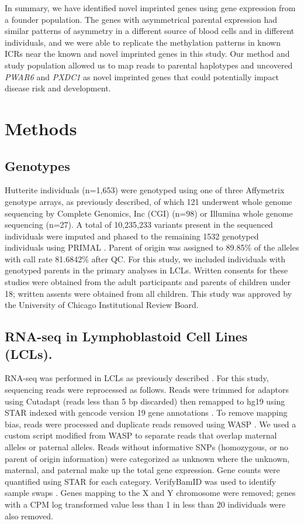 In summary, we have identified novel imprinted genes using gene expression from a founder population. The genes with asymmetrical parental expression had similar patterns of asymmetry in a different source of blood cells and in different individuals, and we were able to replicate the methylation patterns in known ICRs near the known and novel imprinted genes in this study. Our method and study population allowed us to map reads to parental haplotypes and uncovered \emph{PWAR6} and \emph{PXDC1} as novel imprinted genes that could potentially impact disease risk and development.

\section{Methods}\label{ch03-methods}

\subsection{Genotypes}\label{Genotypes}
Hutterite individuals (n=1,653) were genotyped using one of three Affymetrix genotype arrays, as previously described\citep{Livne2015}, of which 121 underwent whole genome sequencing by Complete Genomics, Inc (CGI) (n=98) or Illumina whole genome sequencing (n=27). A total of 10,235,233 variants present in the sequenced individuals were imputed and phased to the remaining 1532 genotyped individuals using PRIMAL \citep{Livne2015}. Parent of origin was assigned to 89.85\% of the alleles with call rate 81.6842\% after QC. For this study, we included individuals with genotyped parents in the primary analyses in LCLs. Written consents for these studies were obtained from the adult participants and parents of children under 18; written assents were obtained from all children. This study was approved by the University of Chicago Institutional Review Board.   

\subsection{RNA-seq in Lymphoblastoid Cell Lines (LCLs).}\label{RNA-seq in Lymphoblastoid Cell Lines (LCLs).}
RNA-seq was performed in LCLs as previously described \citep{Cusanovich:2016id}. For this study, sequencing reads were reprocessed as follows. Reads were trimmed for adaptors using Cutadapt (reads less than 5 bp discarded) then remapped to hg19 using STAR indexed with gencode version 19 gene annotations \citep{Dobin:2002by, Martin:2011eu}. To remove mapping bias, reads were processed and duplicate reads removed using WASP \citep{vandeGeijn:2015hi}. We used a custom script modified from WASP to separate reads that overlap maternal alleles or paternal alleles. Reads without informative SNPs (homozygous, or no parent of origin information) were categorized as unknown where the unknown, maternal, and paternal make up the total gene expression. Gene counts were quantified using STAR for each category. VerifyBamID was used to identify sample swaps \citep{Jun:2012je}. Genes mapping to the X and Y chromosome were removed; genes with a CPM log transformed value less than 1 in less than 20 individuals were also removed.

